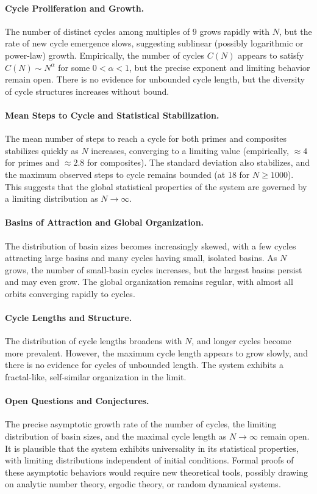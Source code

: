 \documentclass[12pt]{article}
\begin{document}
\paragraph{Cycle Proliferation and Growth.} The number of distinct cycles among multiples of $9$ grows rapidly with $N$, but the rate of new cycle emergence slows, suggesting sublinear (possibly logarithmic or power-law) growth. Empirically, the number of cycles $C(N)$ appears to satisfy $C(N) \sim N^\alpha$ for some $0 < \alpha < 1$, but the precise exponent and limiting behavior remain open. There is no evidence for unbounded cycle length, but the diversity of cycle structures increases without bound.

\paragraph{Mean Steps to Cycle and Statistical Stabilization.} The mean number of steps to reach a cycle for both primes and composites stabilizes quickly as $N$ increases, converging to a limiting value (empirically, $\approx 4$ for primes and $\approx 2.8$ for composites). The standard deviation also stabilizes, and the maximum observed steps to cycle remains bounded (at 18 for $N \geq 1000$). This suggests that the global statistical properties of the system are governed by a limiting distribution as $N \to \infty$.

\paragraph{Basins of Attraction and Global Organization.} The distribution of basin sizes becomes increasingly skewed, with a few cycles attracting large basins and many cycles having small, isolated basins. As $N$ grows, the number of small-basin cycles increases, but the largest basins persist and may even grow. The global organization remains regular, with almost all orbits converging rapidly to cycles.

\paragraph{Cycle Lengths and Structure.} The distribution of cycle lengths broadens with $N$, and longer cycles become more prevalent. However, the maximum cycle length appears to grow slowly, and there is no evidence for cycles of unbounded length. The system exhibits a fractal-like, self-similar organization in the limit.

\paragraph{Open Questions and Conjectures.} The precise asymptotic growth rate of the number of cycles, the limiting distribution of basin sizes, and the maximal cycle length as $N \to \infty$ remain open. It is plausible that the system exhibits universality in its statistical properties, with limiting distributions independent of initial conditions. Formal proofs of these asymptotic behaviors would require new theoretical tools, possibly drawing on analytic number theory, ergodic theory, or random dynamical systems.
\end{document}
